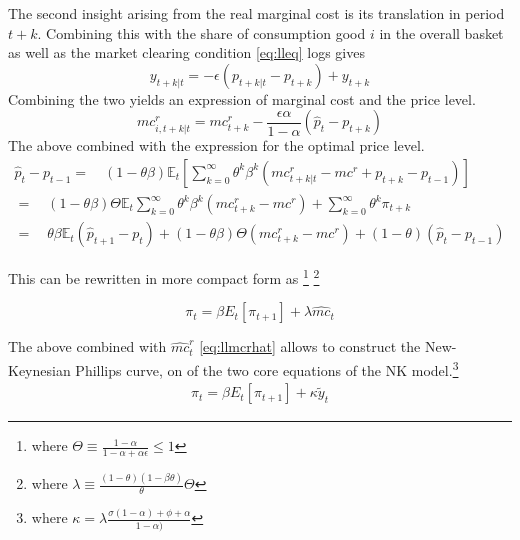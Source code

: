 \documentclass[12pt,a4paper,english]{article} %
\newcommand{\E}{\mathbb{E}} %
\begin{document}
	The second insight arising from the real marginal cost is its translation in period $t+k$. Combining this with the share of consumption good $i$ in the overall basket as well as the market clearing condition \ref{eq:lleq} logs gives 
	\begin{equation}
		y_{t+k|t} = -\epsilon(p_{t+k|t} - p_{t+k}) + y_{t+k}
	\end{equation}
	Combining the two yields an expression of marginal cost and the price level.
	\begin{equation}
		mc_{i, t+k|t}^r = mc_{t+k}^r - \frac{\epsilon \alpha}{1 - \alpha}(\hat{p}_t - p_{t+k})
	\end{equation}
	The above combined with the expression for the optimal price level.
	\begin{equation}
		\begin{aligned}
			\hat{p}_t - p_{t-1} =
			\quad
			(1 - \theta \beta) \E_t
			\left[
			\sum_{k=0}^{\infty} \theta^k \beta^k \left( mc_{t+k|t}^r - mc^r +p_{t+k} - p_{t-1}\right)
			\right] \\			
			=
			\quad
			(1 - \theta \beta) \Theta \E_t
			\sum_{k=0}^{\infty} \theta^k \beta^k (mc_{t+k}^r - mc^r) + 
			\sum_{k=0}^{\infty} \theta^k \pi_{t+k} \\
			=
			\quad
			\theta \beta \E_t (\hat{p}_{t+1} - p_{t}) + (1 - \theta \beta) \Theta (mc_{t+k}^r - mc^r) + (1 - \theta) (\hat{p}_t - p_{t-1})
		\end{aligned}		
	\end{equation} 

	This can be rewritten in more compact form as \footnote{where $\Theta \equiv \frac{1 - \alpha}{1 - \alpha + \alpha \epsilon} \leq 1$} \footnote{	where $\lambda \equiv \frac{(1-\theta)(1-\beta\theta)}{\theta} \Theta$}

	\begin{equation}
		\pi_t = \beta E_t [\pi_{t+1}] + \lambda \hat{mc}_{t}
	\end{equation}

	The above combined with $\hat{mc}_t^r$ \ref{eq:llmcrhat} allows to construct the New-Keynesian Phillips curve, on of the two core equations of the NK model.\footnote{where $\kappa = \lambda \frac{\sigma (1 - \alpha) + \phi + \alpha}{1 - \alpha)}$}
	\begin{equation} \label{eq:llnkp}
		\begin{aligned}
			\pi_t = \beta E_t [\pi_{t+1}] + \kappa \tilde{y}_t
		\end{aligned}
	\end{equation}
	
\end{document}
